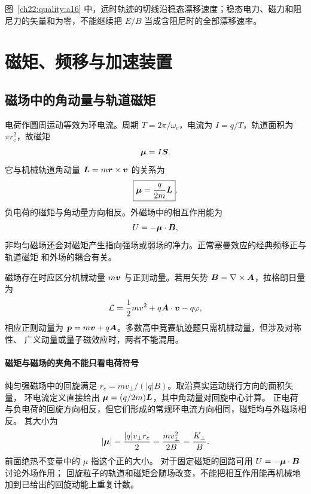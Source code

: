 {\begin{xesolution}
\begin{rTwoFigure}
\end{rTwoFigure}

图~\ref{ch22:quality:a16} 中，远时轨迹的切线沿稳态漂移速度；稳态电力、磁力和阻尼力的矢量和为零，不能继续把 $E/B$ 当成含阻尼时的全部漂移速率。
\end{xesolution}



\section{磁矩、频移与加速装置}

\subsection{磁场中的角动量与轨道磁矩}


电荷作圆周运动等效为环电流。周期 $T=2\pi/\omega_c$，电流为 $I=q/T$，轨道面积为
$\pi r_c^2$，故磁矩
\begin{equation}
 \bm{\mu}=I\bm{S}.
\end{equation}
它与机械轨道角动量 $\bm{L}=m\bm{r}\times\bm{v}$ 的关系为
\begin{equation}
 \boxed{\bm{\mu}=\frac q{2m}\bm{L}}.
\end{equation}
负电荷的磁矩与角动量方向相反。外磁场中的相互作用能为
\begin{equation}
 U=-\bm{\mu}\cdot\bm{B},
\end{equation}
非均匀磁场还会对磁矩产生指向强场或弱场的净力。正常塞曼效应的经典频移正与轨道磁矩
和外场的耦合有关。

磁场存在时应区分机械动量 $m\bm{v}$ 与正则动量。若用矢势
$\bm{B}=\nabla\times\bm{A}$，拉格朗日量为
\begin{equation}
 \mathcal L=\frac12mv^2+q\bm{A}\cdot\bm{v}-q\varphi,
\end{equation}
相应正则动量为 $\bm{p}=m\bm{v}+q\bm{A}$。多数高中竞赛轨迹题只需机械动量，但涉及对称性、
广义动量或量子磁效应时，两者不能混用。



\paragraph{磁矩与磁场的夹角不能只看电荷符号}
纯匀强磁场中的回旋满足 $r_c=mv_\perp/(|q|B)$。取沿真实运动绕行方向的面积矢量，
环电流定义直接给出 $\bm{\mu}=(q/2m)\bm{L}$，其中角动量对回旋中心计算。
正电荷与负电荷的回旋方向相反，但它们形成的常规环电流方向相同，磁矩均与外磁场相反。
其大小为
\[
 |\bm{\mu}|=\frac{|q|v_\perp r_c}{2}=\frac{mv_\perp^2}{2B}=\frac{K_\perp}{B}.
\]
前面绝热不变量中的 $\mu$ 指这个正的大小。
对于固定磁矩的回路可用 $U=-\bm{\mu}\cdot\bm{B}$ 讨论外场作用；
回旋粒子的轨道和磁矩会随场改变，不能把相互作用能再机械地加到已给出的回旋动能上重复计数。


}
